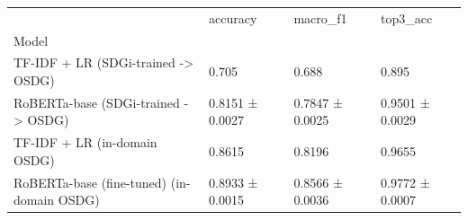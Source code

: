\begin{tabular}{llll}
\toprule
 & accuracy & macro_f1 & top3_acc \\
Model &  &  &  \\
\midrule
TF-IDF + LR  (SDGi-trained -> OSDG) & 0.705 & 0.688 & 0.895 \\
RoBERTa-base  (SDGi-trained -> OSDG) & 0.8151 ± 0.0027 & 0.7847 ± 0.0025 & 0.9501 ± 0.0029 \\
TF-IDF + LR  (in-domain OSDG) & 0.8615 & 0.8196 & 0.9655 \\
RoBERTa-base (fine-tuned)  (in-domain OSDG) & 0.8933 ± 0.0015 & 0.8566 ± 0.0036 & 0.9772 ± 0.0007 \\
\bottomrule
\end{tabular}
